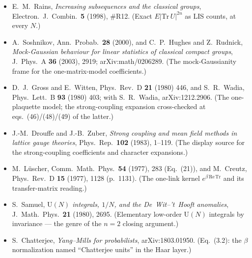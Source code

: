\begin{itemize}
\item E.~M.~Rains, \emph{Increasing subsequences and the classical groups}, Electron.\ J.\ Combin.\ \textbf{5} (1998), \#R12. (Exact $E|\mathrm{Tr}\,U|^{2n}$ as LIS counts, at every $N$.)
\item A.~Soshnikov, Ann.\ Probab.\ \textbf{28} (2000), and C.~P.~Hughes and Z.~Rudnick, \emph{Mock-Gaussian behaviour for linear statistics of classical compact groups}, J.\ Phys.\ A \textbf{36} (2003), 2919; arXiv:math/0206289. (The mock-Gaussianity frame for the one-matrix-model coefficients.)
\item D.~J.~Gross and E.~Witten, Phys.\ Rev.\ D \textbf{21} (1980) 446, and S.~R.~Wadia, Phys.\ Lett.\ B \textbf{93} (1980) 403; with S.~R.~Wadia, arXiv:1212.2906. (The one-plaquette model; the strong-coupling expansion cross-checked at eqs.~(46)/(48)/(49) of the latter.)
\item J.-M.~Drouffe and J.-B.~Zuber, \emph{Strong coupling and mean field methods in lattice gauge theories}, Phys.\ Rep.\ \textbf{102} (1983), 1--119. (The display source for the strong-coupling coefficients and character expansions.)
\item M.~L\"uscher, Comm.\ Math.\ Phys.\ \textbf{54} (1977), 283 (Eq.~(21)), and M.~Creutz, Phys.\ Rev.\ D \textbf{15} (1977), 1128 (p.~1131). (The one-link kernel $e^{\beta\,\mathrm{Re}\,\mathrm{Tr}}$ and its transfer-matrix reading.)
\item S.~Samuel, \emph{$\mathrm U(N)$ integrals, $1/N$, and the De~Wit--'t~Hooft anomalies}, J.\ Math.\ Phys.\ \textbf{21} (1980), 2695. (Elementary low-order $\mathrm U(N)$ integrals by invariance --- the genre of the $n=2$ closing argument.)
\item S.~Chatterjee, \emph{Yang--Mills for probabilists}, arXiv:1803.01950. (Eq.~(3.2): the $\beta$ normalization named ``Chatterjee units'' in the Haar layer.)
\end{itemize}


